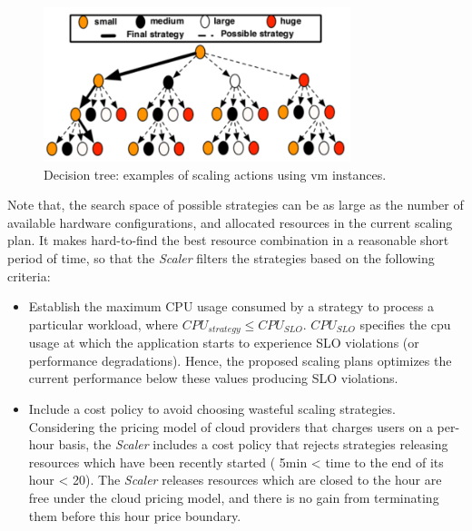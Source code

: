 
\begin{figure}[htb]
  \begin{center}
    \includegraphics[width=\linewidth,height=4.5cm]{images/decisionTree2}
  \end{center}
\vspace{-5mm}
  \caption{Decision tree: examples of scaling actions using vm instances.}
  \label{fig:scalingTree}
\end{figure}


Note that, the search space of possible strategies can be as large as the number of available hardware configurations, and allocated resources in the current scaling plan. It makes hard-to-find the best resource combination in a reasonable short period of time, so that the \emph{Scaler} filters the strategies based on the following criteria:
\begin{itemize}
\item Establish the maximum CPU usage consumed by a strategy to process a particular workload, where \emph{$CPU_{strategy} \leq CPU_{SLO}$}. \emph{$CPU_{SLO}$} specifies the cpu usage at which the application starts to experience SLO violations (or performance degradations). Hence, the proposed scaling plans optimizes the current performance below these values producing SLO violations.


\item Include a cost policy to avoid choosing wasteful scaling strategies. Considering the pricing model of cloud providers that charges users on a per-hour basis, the \emph{Scaler} includes a cost policy that rejects strategies releasing resources which have been recently started ( 5min < time to the end of its hour < 20). The \emph{Scaler} releases resources which are closed to the hour are free under the cloud pricing model, and there is no gain from terminating them before this hour price boundary.

\end{itemize}


